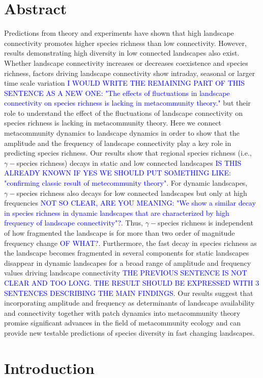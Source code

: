 \documentclass[12pt]{article}
\newcommand{\GM}[1]{\textcolor{Blue}{#1}}
\begin{document}
\section*{Abstract}
Predictions from theory and experiments have shown that high landscape connectivity promotes higher species richness than low connectivity. However, results demonstrating high diversity in low connected landscapes also exist. Whether landscape connectivity increases or decreases coexistence and species richness, factors driving landscape connectivity show intraday, seasonal or larger time scale variation \GM{I WOULD WRITE THE REMAINING PART OF THIS SENTENCE AS A NEW ONE: "The effects of fluctuations in landscape connectivity on species richness is lacking in metacommunity theory."} but their role to understand the effect of the fluctuations of landscape connectivity on species richness is lacking in metacommunity theory. Here we connect metacommunity dynamics to landscape dynamics in order to show that the amplitude and the frequency of landscape connectivity play a key role in predicting species richness. Our results show that regional species richness (i.e., $\gamma-$species richness) decays in static and low connected landscapes \GM{IS THIS ALREADY KNOWN IF YES WE SHOULD PUT SOMETHING LIKE: "confirming  classic result of metecommunity theory"}. For dynamic landscapes, $\gamma-$species richness also decays for low connected landscapes but only at high frequencies \GM{NOT SO CLEAR, ARE YOU MEANING: "We show a similar decay in species richness in dynamic landscapes that are characterized by high frequency of landscape connectivity"?}. Thus, $\gamma-$species richness is independent of how fragmented the landscape is for more than two order of magnitude frequency change \GM{OF WHAT?}. Furthermore, the fast decay in species richness as the landscape becomes fragmented in several components for static landscapes disappear in dynamic landscapes for a broad range of amplitude and frequency values driving landscape connectivity \GM{THE PREVIOUS SENTENCE IS NOT CLEAR AND TOO LONG. THE RESULT SHOULD BE EXPRESSED WITH 3 SENTENCES DESCRIBING THE MAIN FINDINGS}. Our results suggest that incorporating amplitude and frequency as determinants of landscape availability and connectivity together with patch dynamics into metacommunity theory promise significant advances in the field of metacommunity ecology and can provide new testable predictions of species diversity in fast changing landscapes.
\newpage
\section*{Introduction}
\end{document}
